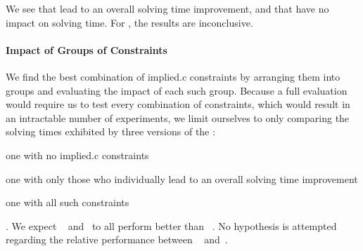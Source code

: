 We see that  lead to an overall solving time
improvement, and that  have no
impact on solving time.
%
For , the results are
inconclusive.


\paragraph{Impact of Groups of Constraints}

We find the best combination of \gls{implied.c} \glspl{constraint} by arranging
them into groups and evaluating the impact of each such group.
%
Because a full evaluation would require us to test every combination of
\glspl{constraint}, which would result in an intractable number of experiments,
we limit ourselves to only comparing the solving times exhibited by three
versions of the :
%
\begin{modelList}
  \item {}
    one with no \gls{implied.c} \glspl{constraint}
  \item {}
    one with only those who individually lead to an overall solving time
    improvement
  \item {}
    one with all such \glspl{constraint}
\end{modelList}.
%
We expect ~
and~ to all perform better than
~.
%
No hypothesis is attempted regarding the relative performance between
~
and~.


